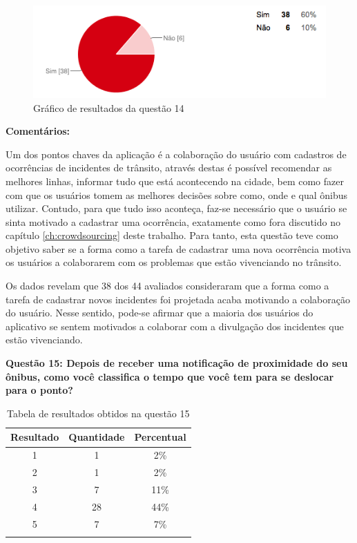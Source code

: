 \begin{figure}[h]
\begin{center}
  \includegraphics[width=16cm]{images/graficos/questao14.png}
  \caption{Gráfico de resultados da questão 14}
  \label{fig:questao14}
\end{center}
\end{figure}

\textbf{Comentários:}

Um dos pontos chaves da aplicação é a colaboração do usuário com cadastros de ocorrências de incidentes de  trânsito, através destas é possível recomendar as melhores linhas, informar tudo que está acontecendo na cidade, bem como fazer com que os usuários tomem as melhores decisões sobre como, onde e qual ônibus utilizar. Contudo, para que tudo isso aconteça, faz-se necessário que o usuário se sinta motivado a cadastrar uma ocorrência, exatamente como fora discutido no capítulo \ref{ch:crowdsourcing} deste trabalho. Para tanto, esta questão teve como objetivo saber se a forma como a tarefa de cadastrar uma nova ocorrência motiva os usuários a colaborarem com os problemas que estão vivenciando no trânsito.     
	
Os dados revelam que 38 dos 44 avaliados consideraram que a forma como a tarefa de cadastrar novos incidentes foi projetada acaba motivando a colaboração do usuário. Nesse sentido, pode-se afirmar que a maioria dos usuários do aplicativo se sentem motivados a colaborar com a divulgação dos incidentes que estão vivenciando.\newline

\textbf{Questão 15: Depois de receber uma notificação de proximidade do seu ônibus, como você classifica o tempo que você tem para se deslocar para o ponto?}

\begin{center}
\begin{longtable}{c|c|c}
\hline
    \multicolumn{1}{c}{\textbf{Resultado}} & \multicolumn{1}{c}{\textbf{Quantidade}} & \multicolumn{1}{c}{\textbf{Percentual}} \\
\hline
    1 & 1 &  2\%\\
    \hline
    2 & 1 & 2\%\\
    \hline
    3 & 7 &  11\%\\
    \hline
    4 & 28 & 44\%\\
    \hline
    5 & 7 & 7\%\\
    \hline
\caption{Tabela de resultados obtidos na questão 15}
\label{tabq15}
\end{longtable}
\end{center}


